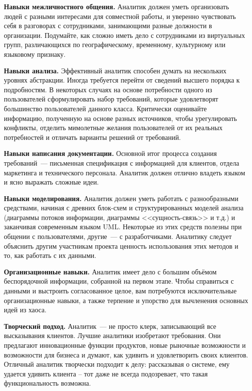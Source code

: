 \documentclass{../../text-style}
\begin{document}
\textbf{Навыки межличностного общения.} Аналитик должен уметь организовать людей с разными интересами для совместной работы, и уверенно чувствовать себя в разговорах с сотрудниками, занимающими разные должности в организации. Подумайте, как сложно иметь дело с сотрудниками из виртуальных групп, различающихся по географическому, временному, культурному или языковому признаку.

\textbf{Навыки анализа.} Эффективный аналитик способен думать на нескольких уровнях абстракции. Иногда требуется перейти от сведений высшего порядка к подробностям. В некоторых случаях на основе потребности одного из пользователей сформулировать набор требований, которые удовлетворят большинство пользователей данного класса. Критически оценивайте информацию, полученную на основе разных источников, чтобы урегулировать конфликты, отделить мимолетные желания пользователей от их реальных потребностей и отличать варианты решений от требований.

\textbf{Навыки написания документации.} Основной итог процесса создания требований~--- письменная спецификация с информацией для клиентов, отдела маркетинга и технического персонала. Аналитик должен отлично владеть языком и ясно выражать сложные идеи.

\textbf{Навыки моделирования.} Аналитик должен уметь работать с разнообразными средствами, начиная с древних блок-схем и структурированных моделей анализа (диаграммы потоков информации, диаграммы <<сущность-связь>> и т.д.) и заканчивая современным языком UML. Некоторые из этих средств полезны при общении с пользователями, другие~--- с разработчиками. Аналитику следует объяснить другим участникам проекта ценность использования этих методов и то, как работать с их данными.

\textbf{Организационные навыки.} Аналитик имеет дело с большим объёмом беспорядочной информации, собранной на первом этапе. Чтобы справиться с данными и выстроить согласованное целое, вам потребуются исключительные организационные навыки, а также терпение и упорство для вычленения основных идей из хаоса.

\textbf{Творческий подход.} Аналитик~--- не просто клерк, записывающий все высказывания клиентов. Лучшие аналитики изобретают требования. Они предлагают инновационные функции продуктов, новые рыночные возможности и возможности для бизнеса и думают, как удивить и удовлетворить своих клиентов. Отличный аналитик творчески подходит к делу: рассказывая о системе, ему удается удивить клиента -- тот даже не всегда подозревает, что такая функциональность возможна.
\end{document}
